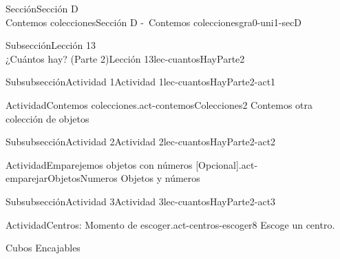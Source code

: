 \begin{sectionptx}{Sección}{{\Large Sección D\\}Contemos colecciones}{}{Sección D -~Contemos colecciones}{}{}{gra0-uni1-secD}
\begin{subsectionptx}{Subsección}{{\normalsize Lección 13\\[-0.05cm]}¿Cuántos hay? (Parte 2)}{}{Lección 13}{}{}{lec-cuantosHayParte2}
%
%
\typeout{************************************************}
\typeout{************************************************}
%
\begin{subsubsectionptx}{Subsubsección}{Actividad 1}{}{Actividad 1}{}{}{lec-cuantosHayParte2-act1}
\begin{activity}{Actividad}{Contemos colecciones.}{act-contemosColecciones2}%
Contemos otra colección de objetos%
\end{activity}%
\end{subsubsectionptx}
%
%
\typeout{************************************************}
\typeout{************************************************}
%
\begin{subsubsectionptx}{Subsubsección}{Actividad 2}{}{Actividad 2}{}{}{lec-cuantosHayParte2-act2}
\begin{activity}{Actividad}{Emparejemos objetos con números [Opcional].}{act-emparejarObjetosNumeros}%
Objetos y números%
\end{activity}%
\end{subsubsectionptx}
%
%
\typeout{************************************************}
\typeout{************************************************}
%
\clearpage
\begin{subsubsectionptx}{Subsubsección}{Actividad 3}{}{Actividad 3}{}{}{lec-cuantosHayParte2-act3}
\begin{activity}{Actividad}{Centros: Momento de escoger.}{act-centros-escoger8}%
Escoge un centro.%
\begin{sidebyside}{2}{0.025}{0.025}{0.05}%
\begin{sbspanel}{0.45}%
Cubos Encajables%
\par

\end{sbspanel}
\end{sidebyside}
\end{activity}
\end{subsubsectionptx}
\end{subsectionptx}
\end{sectionptx}
